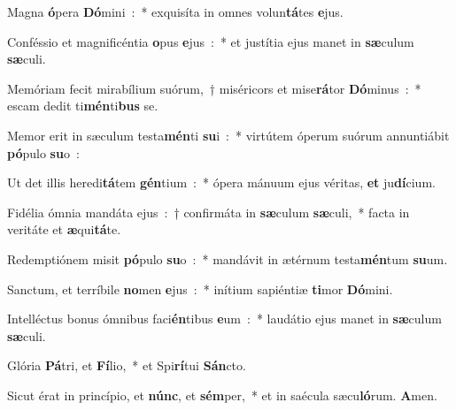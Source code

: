 ﻿\item Magna \textbf{ó}\-pera \textbf{Dó}\-mini~:~* exquisíta in omnes vo\-lun\-\textbf{tá}\-tes \textbf{e}\-jus.
\item Conféssio et magnificéntia \textbf{o}\-pus \textbf{e}\-jus~:~* et justítia ejus manet in \textbf{sæ}\-culum \textbf{sæ}\-culi.
\item Memóriam fecit mirabílium suórum,~† miséricors et mise\textbf{rá}\-tor \textbf{Dó}\-minus~:~* escam dedit ti\textbf{mén}\-ti\textbf{bus} se.
\item Memor erit in sæculum testa\textbf{mén}\-ti \textbf{su}\-i~:~* virtútem óperum suórum annuntiábit \textbf{pó}\-pulo \textbf{su}\-o~:
\item Ut det illis heredi\textbf{tá}\-tem \textbf{gén}\-tium~:~* ópera mánuum ejus véritas, \textbf{et} ju\textbf{dí}\-cium.
\item Fidélia ómnia mandáta ejus~:~† confirmáta in \textbf{sæ}\-cu\-lum \textbf{sæ}\-culi,~* facta in veritáte et \textbf{æ}\-qui\textbf{tá}\-te.
\item Redemptiónem misit \textbf{pó}\-pulo \textbf{su}\-o~:~* mandávit in ætérnum testa\textbf{mén}\-tum \textbf{su}\-um.
\item Sanctum, et terríbile \textbf{no}\-men \textbf{e}\-jus~:~* inítium sapiéntiæ \textbf{ti}\-mor \textbf{Dó}\-mini.
\item Intelléctus bonus ómnibus faci\textbf{én}\-tibus \textbf{e}\-um~:~* laudátio ejus manet in \textbf{sæ}\-culum \textbf{sæ}\-culi.
\item Glória \textbf{Pá}\-tri, et \textbf{Fí}\-lio,~* et Spi\textbf{rí}\-tui \textbf{Sán}\-cto.
\item Sicut érat in princípio, et \textbf{núnc}, et \textbf{sém}\-per,~* et in saé\-cu\-la sæcu\textbf{ló}\-rum. \textbf{A}\-men.